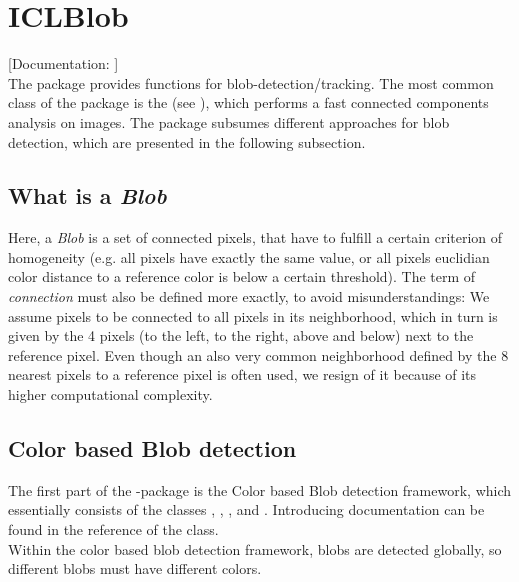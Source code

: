 \section{ICLBlob\label{sec:blob}}

[Documentation: ]\\

The package  provides functions for blob-detection/tracking. The most common class of the package is the   (see ), which performs a fast connected components analysis on images. The package subsumes different approaches for blob detection, which are presented in the following subsection.

\subsection{What is a \emph{Blob}}
Here, a \emph{Blob} is a set of connected pixels, that have to fulfill a certain criterion of homogeneity (e.g. all pixels have exactly the same value, or all pixels euclidian color distance to a reference color is below a certain threshold). The term of \emph{connection} must also be defined more exactly, to avoid misunderstandings: We assume pixels to be connected to all pixels in its neighborhood, which in turn is given by the 4 pixels (to the left, to the right, above and below) next to the reference pixel. 
Even though an also very common neighborhood defined by the 8 nearest pixels to a reference pixel is often used, we resign of it because of its higher computational complexity. 

\subsection{Color based Blob detection}
The first part of the -package is the Color based Blob detection framework, which essentially consists of the classes , , ,  and . Introducing documentation can be found in the reference of the  class.\\
Within the color based blob detection framework, blobs are detected globally, so different blobs must have different colors.

